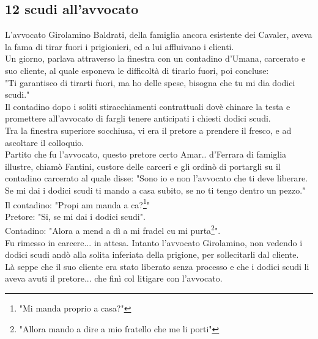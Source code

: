 \subsection{12 scudi all'avvocato}
L'avvocato Girolamino Baldrati, della famiglia ancora esistente dei Cavaler, aveva la fama di tirar fuori i prigionieri, ed a lui affluivano i clienti. \\
Un giorno, parlava attraverso la finestra con un contadino d'Umana, carcerato e suo cliente, al quale esponeva le difficoltà di tirarlo fuori, poi concluse:\\
"Ti garantisco di tirarti fuori, ma ho delle spese, bisogna che tu mi dia dodici scudi."\\
Il contadino dopo i soliti stiracchiamenti contrattuali dovè chinare la testa e promettere all'avvocato di fargli tenere anticipati i chiesti dodici scudi.\\
Tra la finestra superiore socchiusa, vi era il pretore a prendere il fresco, e ad ascoltare il colloquio.\\
Partito che fu l'avvocato, questo pretore certo Amar\:.\:. d'Ferrara di famiglia illustre, chiamò Fantini, custore delle carceri e gli ordinò di portargli su il contadino carcerato al quale disse: "Sono io e non l'avvocato che ti deve liberare. Se mi dai i dodici scudi ti mando a casa subito, se no ti tengo dentro un pezzo."\\
Il contadino: "Propi am manda a ca?\footnote{"Mi manda proprio a casa?"}"\\
Pretore: "Si, se mi dai i dodici scudi".\\
Contadino: "Alora a mend a dì a mi fradel cu mi purta\footnote{"Allora mando a dire a mio fratello che me li porti"}".\\
Fu rimesso in carcere... in attesa. Intanto l'avvocato Girolamino, non vedendo i dodici scudi andò alla solita inferiata della prigione, per sollecitarli dal cliente.\\
Là seppe che il suo cliente era stato liberato senza processo e che i dodici scudi li aveva avuti il pretore... che finì col litigare con l'avvocato.

